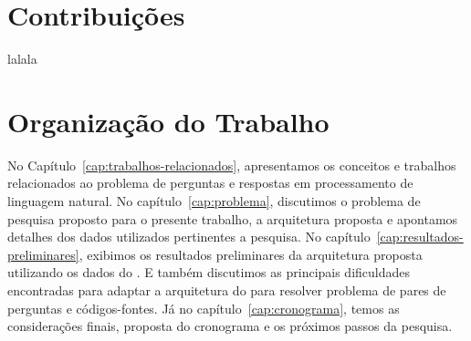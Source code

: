\section{Contribuições}
\label{sec:contribucoes}

lalala

\section{Organização do Trabalho}
\label{sec:organizacao_trabalho}

No Capítulo~\ref{cap:trabalhos-relacionados}, apresentamos os conceitos e trabalhos relacionados ao problema de perguntas e respostas em processamento de linguagem natural. No capítulo~\ref{cap:problema}, discutimos o problema de pesquisa proposto para o presente trabalho, a arquitetura proposta e apontamos detalhes dos dados utilizados pertinentes a pesquisa. 
No capítulo~\ref{cap:resultados-preliminares}, exibimos os resultados preliminares da arquitetura proposta utilizando os dados do \cite{yao-2018}. E também discutimos as principais dificuldades encontradas para adaptar a arquitetura do \cite{feng-2015} para resolver problema de pares de perguntas e códigos-fontes. Já no capítulo~\ref{cap:cronograma}, temos as considerações finais, proposta do cronograma e os próximos passos da pesquisa.
